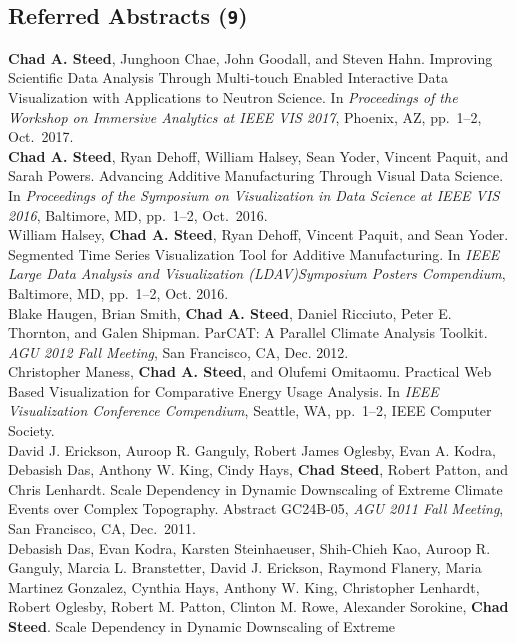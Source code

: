 \documentclass[11pt, letterpaper]{article}
\newcommand{\years}[1]{\marginnote{\scriptsize #1}}
\begin{document}
\subsection*{Referred Abstracts (\texttt{9})}
\noindent\years{2017}\textbf{Chad A. Steed}, Junghoon Chae, John Goodall, and Steven Hahn.  Improving Scientific Data Analysis Through Multi-touch Enabled Interactive Data Visualization with Applications to Neutron Science.  In \emph{Proceedings of the Workshop on Immersive Analytics at IEEE VIS 2017}, Phoenix, AZ, pp.\ 1--2, Oct.\ 2017.\\
\years{2016}\textbf{Chad A. Steed}, Ryan Dehoff, William Halsey, Sean Yoder, Vincent Paquit, and Sarah Powers.  Advancing Additive Manufacturing Through Visual Data Science.  In \emph{Proceedings of the Symposium on Visualization in Data Science at IEEE VIS 2016}, Baltimore, MD, pp.\ 1--2, Oct.\ 2016.\\
\years{2016}William Halsey, \textbf{Chad A. Steed}, Ryan Dehoff,
Vincent Paquit, and Sean Yoder. Segmented Time Series Visualization Tool for
Additive Manufacturing.  In \emph{IEEE Large Data Analysis and Visualization
(LDAV)Symposium Posters Compendium}, Baltimore, MD, pp.\ 1--2, Oct. 2016.\\
\years{2012}Blake Haugen, Brian Smith, \textbf{Chad A. Steed},
Daniel Ricciuto, Peter E. Thornton, and Galen Shipman.  ParCAT: A Parallel
Climate Analysis Toolkit. \emph{AGU 2012 Fall Meeting}, San Francisco, CA, Dec. 2012.\\
\years{2012}Christopher Maness, \textbf{Chad A. Steed}, and
Olufemi Omitaomu. Practical Web Based Visualization for Comparative Energy
Usage Analysis.  In \emph{IEEE Visualization Conference Compendium}, Seattle, WA,
pp.\ 1--2, IEEE Computer Society.\\
\years{2011}David J. Erickson, Auroop R. Ganguly, Robert
James Oglesby, Evan A. Kodra, Debasish Das, Anthony W. King, Cindy Hays,
\textbf{Chad Steed}, Robert Patton, and Chris Lenhardt. Scale Dependency in
Dynamic Downscaling of Extreme Climate Events over Complex Topography.
Abstract GC24B-05, \emph{AGU 2011 Fall Meeting}, San Francisco, CA,
Dec.\ 2011.\\
\years{2010}Debasish Das, Evan Kodra, Karsten Steinhaeuser, Shih-Chieh Kao,
Auroop R. Ganguly, Marcia L. Branstetter, David J. Erickson, Raymond Flanery,
Maria Martinez Gonzalez, Cynthia Hays, Anthony W. King, Christopher Lenhardt,
Robert Oglesby, Robert M. Patton, Clinton M. Rowe, Alexander Sorokine,
\textbf{Chad Steed}.  Scale Dependency in Dynamic Downscaling of Extreme
\end{document}
